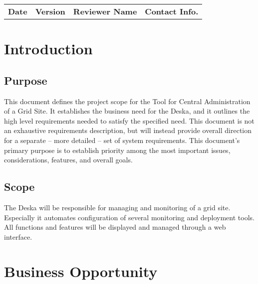 \documentclass[12pt]{article}
\begin{document}
\begin{table}[!h]
	\begin{tabular}{l l l l}
		\textbf{Date} & \textbf{Version} & \textbf{Reviewer Name} & \textbf{Contact Info.} \\
	\end{tabular}
	\label{tab:DocumentApproval}
\end{table}


\newpage

\tableofcontents

\newpage

\section{Introduction}

\subsection{Purpose}
This document defines the project scope for the Tool for Central Administration of a Grid Site. It establishes the business need for 
the Deska, and it outlines the high level requirements needed to satisfy the specified need. This document is not an exhaustive 
requirements description, but will instead provide overall direction for a separate -- more detailed -- set of system requirements. 
This document's primary purpose is to establish priority among the most important issues, considerations, features, and overall goals.

\subsection{Scope}
The Deska will be responsible for managing and monitoring of a grid site. Especially it automates configuration of several monitoring 
and deployment tools. All functions and features will be displayed and managed through a web interface.


\section{Business Opportunity}
\end{document}
